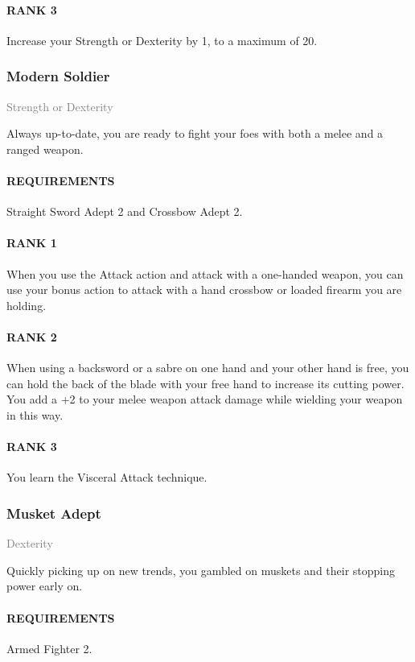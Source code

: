 \paragraph{RANK 3} Increase your Strength or Dexterity by 1, to a maximum of 20.

\subsubsection{Modern Soldier} \label{feat::modernsoldier}
\small{\textcolor{gray}{Strength or Dexterity}}

\normalsize
Always up-to-date, you are ready to fight your foes with both a melee and a ranged weapon.
\paragraph{REQUIREMENTS} Straight Sword Adept 2 and Crossbow Adept 2.
\paragraph{RANK 1} When you use the Attack action and attack with a one-handed weapon, you can use your bonus action to attack with a hand crossbow or loaded firearm you are holding.
\paragraph{RANK 2} When using a backsword or a sabre on one hand and your other hand is free, you can hold the back of the blade with your free hand to increase its cutting power.
You add a +2 to your melee weapon attack damage while wielding your weapon in this way.
\paragraph{RANK 3} You learn the Visceral Attack technique.

\subsubsection{Musket Adept} \label{feat::musketadept}
\small{\textcolor{gray}{Dexterity}}

\normalsize
Quickly picking up on new trends, you gambled on muskets and their stopping power early on.
\paragraph{REQUIREMENTS} Armed Fighter 2.
